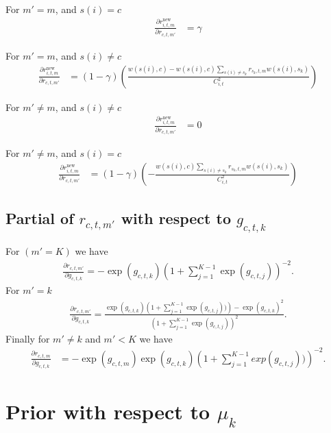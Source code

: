 \documentclass[12pt]{article}
\begin{document}
For $m'=m$, and $s(i) = c$
\begin{align*}
        \frac{\partial r^\text{new}_{i,t,m} }{\partial r_{c,t,m'}} &= \gamma 
\end{align*}

For $m'=m$, and $s(i) \neq c$
\begin{align*}
        \frac{\partial r^\text{new}_{i,t,m} }{\partial r_{c,t,m'}} &= (1-\gamma) \left(\frac{w(s(i),c)- w(s(i),c) \sum_{s(i) \neq s_k} r_{s_k,t,m} w(s(i),s_k)}{C_{i,t}^2} \right)
\end{align*}

For $m' \neq m$, and $s(i) \neq c$
\begin{align*}
        \frac{\partial r^\text{new}_{i,t,m} }{\partial r_{c,t,m'}} &= 0
\end{align*}

For $m' \neq m$, and $s(i) = c$
\begin{align*}
        \frac{\partial r^\text{new}_{i,t,m} }{\partial r_{c,t,m'}} &= (1-\gamma) \left(- \frac{w(s(i),c) \sum_{s(i) \neq s_k} r_{s_k,t,m} w(s(i),s_k)}{C_{i,t}^2} \right)
\end{align*}

\subsection{Partial of $r_{c,t,m'}$ with respect to $g_{c,t,k}$}


For $(m' = K)$ we have
\begin{align*}
  \frac{\partial r_{c,t,m'}}{\partial g_{c,t,k}} = -\exp(g_{c,t,k})\left( 1 +
  \sum_{j=1}^{K-1} \exp(g_{c,t,j})\right)^{-2}.
\end{align*}
For $m' = k$ 
\begin{align*}
  \frac{\partial r_{c,t,m'}}{\partial g_{c,t,k}} = \frac{\exp(g_{c,t,k})\left(
  1 + \sum_{j=1}^{K-1} \exp(g_{c,t,j}))\right) - \exp(g_{c,t,k})^2}{\left(1 +
  \sum_{j=1}^{K-1} \exp(g_{c,t,j})\right)^2}.
\end{align*}
Finally for $m' \neq k$ and $m' < K$ we have
\begin{align*}
  \frac{\partial r_{c,t,m}}{\partial g_{c,t,k}} &= -\exp(g_{c,t,m})
  \exp(g_{c,t,k})\left( 1 + \sum_{j=1}^{K-1} exp(g_{c,t,j}))\right)^{-2}.
\end{align*}

\section{Prior with respect to $\mu_k$}
\end{document}
